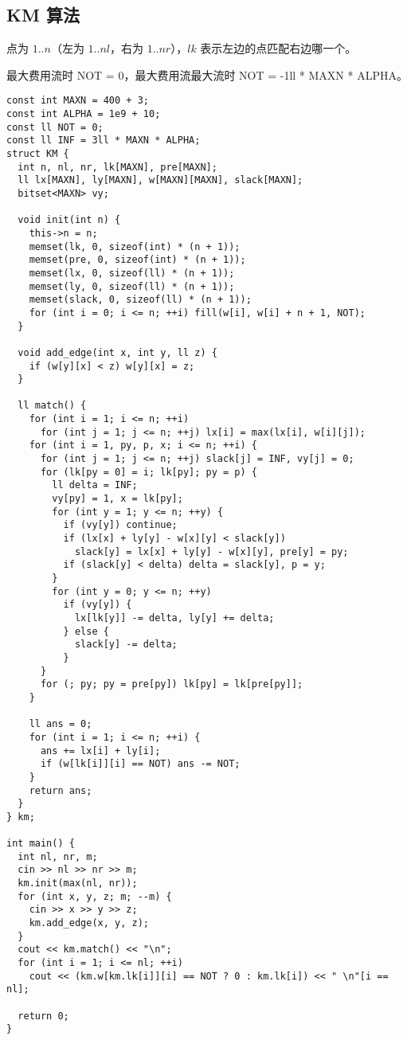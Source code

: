 \subsection{KM 算法}
点为 $1..n$（左为 $1..nl$，右为 $1..nr$），$lk$ 表示左边的点匹配右边哪一个。

最大费用流时 NOT = 0，最大费用流最大流时 NOT = -1ll * MAXN * ALPHA。
\begin{lstlisting}
const int MAXN = 400 + 3;
const int ALPHA = 1e9 + 10;
const ll NOT = 0;
const ll INF = 3ll * MAXN * ALPHA;
struct KM {
  int n, nl, nr, lk[MAXN], pre[MAXN];
  ll lx[MAXN], ly[MAXN], w[MAXN][MAXN], slack[MAXN];
  bitset<MAXN> vy;

  void init(int n) {
    this->n = n;
    memset(lk, 0, sizeof(int) * (n + 1));
    memset(pre, 0, sizeof(int) * (n + 1));
    memset(lx, 0, sizeof(ll) * (n + 1));
    memset(ly, 0, sizeof(ll) * (n + 1));
    memset(slack, 0, sizeof(ll) * (n + 1));
    for (int i = 0; i <= n; ++i) fill(w[i], w[i] + n + 1, NOT);
  }

  void add_edge(int x, int y, ll z) {
    if (w[y][x] < z) w[y][x] = z;
  }

  ll match() {
    for (int i = 1; i <= n; ++i)
      for (int j = 1; j <= n; ++j) lx[i] = max(lx[i], w[i][j]);
    for (int i = 1, py, p, x; i <= n; ++i) {
      for (int j = 1; j <= n; ++j) slack[j] = INF, vy[j] = 0;
      for (lk[py = 0] = i; lk[py]; py = p) {
        ll delta = INF;
        vy[py] = 1, x = lk[py];
        for (int y = 1; y <= n; ++y) {
          if (vy[y]) continue;
          if (lx[x] + ly[y] - w[x][y] < slack[y])
            slack[y] = lx[x] + ly[y] - w[x][y], pre[y] = py;
          if (slack[y] < delta) delta = slack[y], p = y;
        }
        for (int y = 0; y <= n; ++y)
          if (vy[y]) {
            lx[lk[y]] -= delta, ly[y] += delta;
          } else {
            slack[y] -= delta;
          }
      }
      for (; py; py = pre[py]) lk[py] = lk[pre[py]];
    }

    ll ans = 0;
    for (int i = 1; i <= n; ++i) {
      ans += lx[i] + ly[i];
      if (w[lk[i]][i] == NOT) ans -= NOT;
    }
    return ans;
  }
} km;

int main() {
  int nl, nr, m;
  cin >> nl >> nr >> m;
  km.init(max(nl, nr));
  for (int x, y, z; m; --m) {
    cin >> x >> y >> z;
    km.add_edge(x, y, z);
  }
  cout << km.match() << "\n";
  for (int i = 1; i <= nl; ++i)
    cout << (km.w[km.lk[i]][i] == NOT ? 0 : km.lk[i]) << " \n"[i == nl];

  return 0;
}
\end{lstlisting}
